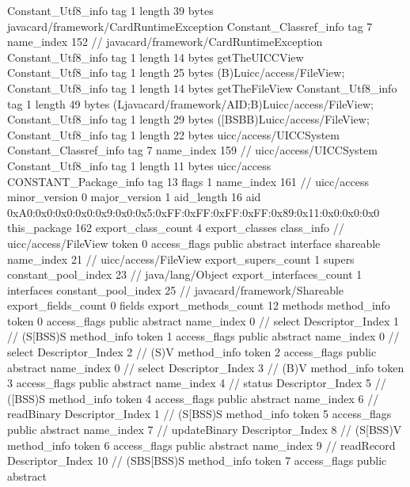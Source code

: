 {{{		}
		Constant_Utf8_info {
			tag	1
			length	39
			bytes	javacard/framework/CardRuntimeException
		}
		Constant_Classref_info {
			tag	7
			name_index	152		// javacard/framework/CardRuntimeException
		}
		Constant_Utf8_info {
			tag	1
			length	14
			bytes	getTheUICCView
		}
		Constant_Utf8_info {
			tag	1
			length	25
			bytes	(B)Luicc/access/FileView;
		}
		Constant_Utf8_info {
			tag	1
			length	14
			bytes	getTheFileView
		}
		Constant_Utf8_info {
			tag	1
			length	49
			bytes	(Ljavacard/framework/AID;B)Luicc/access/FileView;
		}
		Constant_Utf8_info {
			tag	1
			length	29
			bytes	([BSBB)Luicc/access/FileView;
		}
		Constant_Utf8_info {
			tag	1
			length	22
			bytes	uicc/access/UICCSystem
		}
		Constant_Classref_info {
			tag	7
			name_index	159		// uicc/access/UICCSystem
		}
		Constant_Utf8_info {
			tag	1
			length	11
			bytes	uicc/access
		}
		CONSTANT_Package_info {
			tag	13
			flags	1
			name_index	161		// uicc/access
			minor_version	0
			major_version	1
			aid_length	16
			aid	0xA0:0x0:0x0:0x0:0x9:0x0:0x5:0xFF:0xFF:0xFF:0xFF:0x89:0x11:0x0:0x0:0x0
		}
	}
	this_package	162
	export_class_count	4
	export_classes {
		class_info {		// uicc/access/FileView
			token	0
			access_flags	public abstract interface shareable
			name_index	21		// uicc/access/FileView
			export_supers_count	1
			supers {
				constant_pool_index	23		// java/lang/Object
			}
			export_interfaces_count	1
			interfaces {
				constant_pool_index	25		// javacard/framework/Shareable
			}
			export_fields_count	0
			fields {
			}
			export_methods_count	12
			methods {
				method_info {
					token	0
					access_flags	public abstract
					name_index	0		// select
					Descriptor_Index	1		// (S[BSS)S
				}
				method_info {
					token	1
					access_flags	public abstract
					name_index	0		// select
					Descriptor_Index	2		// (S)V
				}
				method_info {
					token	2
					access_flags	public abstract
					name_index	0		// select
					Descriptor_Index	3		// (B)V
				}
				method_info {
					token	3
					access_flags	public abstract
					name_index	4		// status
					Descriptor_Index	5		// ([BSS)S
				}
				method_info {
					token	4
					access_flags	public abstract
					name_index	6		// readBinary
					Descriptor_Index	1		// (S[BSS)S
				}
				method_info {
					token	5
					access_flags	public abstract
					name_index	7		// updateBinary
					Descriptor_Index	8		// (S[BSS)V
				}
				method_info {
					token	6
					access_flags	public abstract
					name_index	9		// readRecord
					Descriptor_Index	10		// (SBS[BSS)S
				}
				method_info {
					token	7
					access_flags	public abstract
}}}}}
